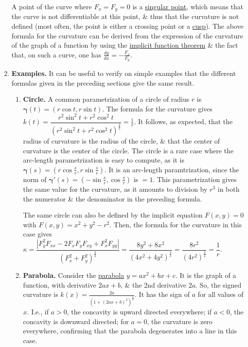 \documentclass{article}
\begin{document}
\begin{enumerate}
	A point of the curve where $F_x = F_y = 0$ is a \href{https://en.wikipedia.org/wiki/Singular_point_of_a_curve}{singular point}, which means that the curve is not differentiable at this point, \& thus that the curvature is not defined (most often, the point is either a crossing point or a \href{https://en.wikipedia.org/wiki/Cusp_(singularity)}{cusp}). The above formula for the curvature can be derived from the expression of the curvature of the graph of a function by using the \href{https://en.wikipedia.org/wiki/Implicit_function_theorem}{implicit function theorem} \& the fact that, on such a curve, one has $\frac{dy}{dx} = -\frac{F_x}{F_y}$.
	\item {\bf Examples.} It can be useful to verify on simple examples that the different formulas given in the preceding sections give the same result.
	\begin{enumerate}
		\item {\bf Circle.} A common parametrization of a circle of radius $r$ is $\boldsymbol{\gamma}(t) = (r\cos t,r\sin t)$. The formula for the curvature gives $k(t) = \dfrac{r^2\sin^2t + r^2\cos^2t}{(r^2\sin^2t + r^2\cos^2t)^{\frac{3}{2}}} = \frac{1}{r}$. It follows, as expected, that the radius of curvature is the radius of the circle, \& that the center of curvature is the center of the circle. The circle is a rare case where the arc-length parametrization is easy to compute, as it is $\boldsymbol{\gamma}(s) = \left(r\cos\frac{s}{r},r\sin\frac{s}{r}\right)$. It is an arc-length paramtrization, since the norm of $\boldsymbol{\gamma}'(s) =\left(-\sin\frac{s}{r},\cos\frac{s}{r}\right)$ is $= 1$. This parametrization gives the same value for the curvature, as it amounts to division by $r^3$ in both the numerator \& the denominator in the preceding formula.
		
		The same circle can also be defined by the implicit equation $F(x,y) = 0$ with $F(x,y) = x^2 + y^2 - r^2$. Then, the formula for the curvature in this case gives $\kappa = \dfrac{|F_y^2F_{xx} - 2F_xF_yF_{xy} + F_x^2F_{yy}|}{(F_x^2 + F_y^2)^{\frac{3}{2}}} = \dfrac{8y^2 + 8x^2}{(4x^2 + 4y^2)^{\frac{3}{2}}} = \dfrac{8r^2}{(4r^2)^{\frac{3}{2}}} = \dfrac{1}{r}$.
		\item {\bf Parabola.} Consider the \href{https://en.wikipedia.org/wiki/Parabola}{parabola} $y = ax^2 + bx + c$. It is the graph of a function, with derivative $2ax + b$, \& the 2nd derivative $2a$. So, the signed curvature is $k(x) = \frac{2a}{(1 + (2ax + b)^2)^{\frac{3}{2}}}$. It has the sign of $a$ for all values of $x$. I.e., if $a > 0$, the concavity is upward directed everywhere; if $a < 0$, the concavity is downward directed; for $a = 0$, the curvature is zero everywhere, confirming that the parabola degenerates into a line in this case.
		

\end{enumerate}
\end{enumerate}
\end{document}
